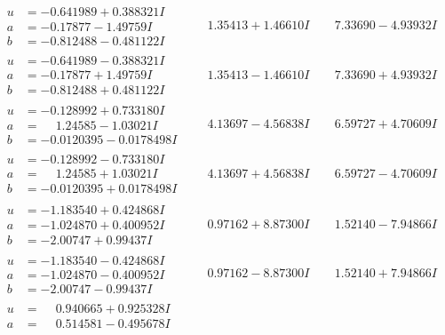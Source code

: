 \documentclass[1p]{elsarticle_modified}
\theoremstyle{definition}
\begin{document}
$$\begin{array}{c|c|c}
 \hline 
\begin{aligned}
u &= -0.641989 + 0.388321 I \\
a &= -0.17877 - 1.49759 I \\
b &= -0.812488 - 0.481122 I\end{aligned}
 & \phantom{-}1.35413 + 1.46610 I & \phantom{-}7.33690 - 4.93932 I \\ \hline\begin{aligned}
u &= -0.641989 - 0.388321 I \\
a &= -0.17877 + 1.49759 I \\
b &= -0.812488 + 0.481122 I\end{aligned}
 & \phantom{-}1.35413 - 1.46610 I & \phantom{-}7.33690 + 4.93932 I \\ \hline\begin{aligned}
u &= -0.128992 + 0.733180 I \\
a &= \phantom{-}1.24585 - 1.03021 I \\
b &= -0.0120395 - 0.0178498 I\end{aligned}
 & \phantom{-}4.13697 - 4.56838 I & \phantom{-}6.59727 + 4.70609 I \\ \hline\begin{aligned}
u &= -0.128992 - 0.733180 I \\
a &= \phantom{-}1.24585 + 1.03021 I \\
b &= -0.0120395 + 0.0178498 I\end{aligned}
 & \phantom{-}4.13697 + 4.56838 I & \phantom{-}6.59727 - 4.70609 I \\ \hline\begin{aligned}
u &= -1.183540 + 0.424868 I \\
a &= -1.024870 + 0.400952 I \\
b &= -2.00747 + 0.99437 I\end{aligned}
 & \phantom{-}0.97162 + 8.87300 I & \phantom{-}1.52140 - 7.94866 I \\ \hline\begin{aligned}
u &= -1.183540 - 0.424868 I \\
a &= -1.024870 - 0.400952 I \\
b &= -2.00747 - 0.99437 I\end{aligned}
 & \phantom{-}0.97162 - 8.87300 I & \phantom{-}1.52140 + 7.94866 I \\ \hline\begin{aligned}
u &= \phantom{-}0.940665 + 0.925328 I \\
a &= \phantom{-}0.514581 - 0.495678 I \\

\end{aligned}
\end{array}$$
\end{document}
